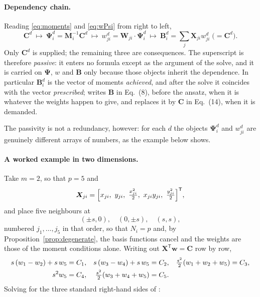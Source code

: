 \documentclass[11pt,a4paper]{article}
\begin{document}
\paragraph{Dependency chain.} Reading \eqref{eq:moments} and \eqref{eq:wPsi} from right
to left,
\begin{equation}
\bm C^{d}\ \longmapsto\ \bm\Psi^{d}_i=\bm M_i^{-1}\bm C^{d}
\ \longmapsto\ w^{d}_{ji}=\bm W_{ji}\cdot\bm\Psi^{d}_i
\ \longmapsto\ \bm B^{d}_i=\sum_j\bm X_{ji}w^{d}_{ji}\;\bigl(=\bm C^{d}\bigr).
\label{eq:dchain}
\end{equation}
Only $\bm C^{d}$ is supplied; the remaining three are consequences. The superscript is
therefore \emph{passive}: it enters no formula except as the argument of the solve, and
it is carried on $\bm\Psi$, $w$ and $\bm B$ only because those objects inherit the
dependence. In particular $\bm B^{d}_i$ is the vector of moments \emph{achieved}, and
after the solve it coincides with the vector \emph{prescribed}; \cite{KLN2020} writes
$\bm B$ in Eq.~(8), before the ansatz, when it is whatever the weights happen to give,
and replaces it by $\bm C$ in Eq.~(14), when it is demanded.

The passivity is not a redundancy, however: for each $d$ the objects
$\bm\Psi^{d}_i$ and $w^{d}_{ji}$ are genuinely different arrays of numbers, as the
example below shows.

\paragraph{A worked example in two dimensions.} Take $m=2$, so that $p=5$ and
\begin{equation*}
\bm X_{ji}=\Bigl[x_{ji},\ y_{ji},\ \tfrac{x_{ji}^{2}}{2},\ x_{ji}y_{ji},\
\tfrac{y_{ji}^{2}}{2}\Bigr]^{\mathsf T},
\end{equation*}
and place five neighbours at
\begin{equation}
(\pm s,0),\quad (0,\pm s),\quad (s,s),
\label{eq:2dstencil}
\end{equation}
numbered $j_1,\dots,j_5$ in that order, so that $N_i=p$ and, by
Proposition~\ref{prop:degenerate}, the basis functions cancel and the weights are those
of the moment conditions alone. Writing out $\bm X^{\mathsf T}\bm w=\bm C$ row by row,
\begin{align}
s\,(w_1-w_2)+s\,w_5&=C_1, &
s\,(w_3-w_4)+s\,w_5&=C_2, &
\tfrac{s^{2}}{2}(w_1+w_2+w_5)&=C_3,\notag\\
s^{2}w_5&=C_4, &
\tfrac{s^{2}}{2}(w_3+w_4+w_5)&=C_5. & &
\label{eq:2dsys}
\end{align}
Solving for the three standard right-hand sides of \cite[Eq.~(5)]{KLN2020}:
\end{document}
